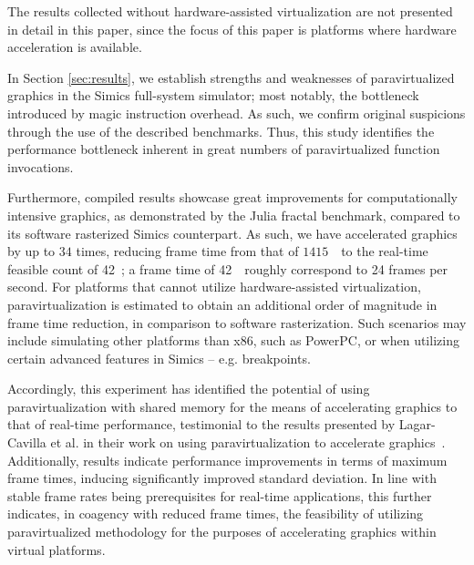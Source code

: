 \documentclass{article}
\newcommand{\masccite}[2][]{\cite{#2}}
\begin{document}
The results collected without hardware-assisted virtualization are not presented in detail in this paper, since the focus of this paper is platforms where hardware acceleration is available.

In Section \ref{sec:results}, we establish strengths and weaknesses of paravirtualized graphics in the Simics full-system simulator; most notably, the bottleneck introduced by magic instruction overhead.
As such, we confirm original suspicions through the use of the described benchmarks.
Thus, this study identifies the performance bottleneck inherent in great numbers of paravirtualized function invocations.

Furthermore, compiled results showcase great improvements for computationally intensive graphics, as demonstrated by the Julia fractal benchmark, compared to its software rasterized Simics counterpart.
As such, we have accelerated graphics by up to $34$ times, reducing frame time from that of $1415$~\milli\second\ to the real-time feasible count of 42~\milli\second ; a frame time of 42~\milli\second\ roughly correspond to 24 frames per second.
For platforms that cannot utilize hardware-assisted virtualization, paravirtualization is estimated to obtain an additional order of magnitude in frame time reduction, in comparison to software rasterization.
Such scenarios may include simulating other platforms than x86, such as PowerPC, or when utilizing certain advanced features in Simics -- e.g. breakpoints.

Accordingly, this experiment has identified the potential of using paravirtualization with shared memory for the means of accelerating graphics to that of real-time performance, testimonial to the results presented by Lagar-Cavilla et al. in their work on using paravirtualization to accelerate graphics~\masccite{inproceedings:lagarcavilla:2007}.
Additionally, results indicate performance improvements in terms of maximum frame times, inducing significantly improved standard deviation.
In line with stable frame rates being prerequisites for real-time applications, this further indicates, in coagency with reduced frame times, the feasibility of utilizing paravirtualized methodology for the purposes of accelerating graphics within virtual platforms.
\end{document}
